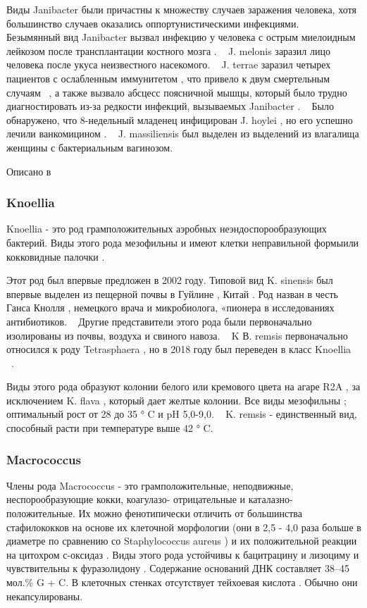 \documentclass[11pt]{article}
\begin{document}
	Виды Janibacter были причастны к множеству случаев заражения человека, хотя большинство случаев оказались оппортунистическими инфекциями.  ~\cite{Janibacter_8} Безымянный вид Janibacter вызвал инфекцию у человека с острым миелоидным лейкозом после трансплантации костного мозга .  ~\cite{Janibacter_9} J. melonis заразил лицо человека после укуса неизвестного насекомого.  ~\cite{Janibacter_10} J. terrae заразил четырех пациентов с ослабленным иммунитетом , что привело к двум смертельным случаям  ~\cite{Janibacter_11}, а также вызвало абсцесс поясничной мышцы, который было трудно диагностировать из-за редкости инфекций, вызываемых Janibacter . ~\cite{Janibacter_12} Было обнаружено, что 8-недельный младенец инфицирован J. hoylei , но его успешно лечили ванкомицином .  ~\cite{Janibacter_8} J. massiliensis был выделен из выделений из влагалища женщины с бактериальным вагинозом.  ~\cite{Janibacter_1}
	
	Описано в  ~\cite{Janibacter_1,Janibacter_2,Janibacter_3,Janibacter_4,Janibacter_5,Janibacter_6,Janibacter_7,Janibacter_8,Janibacter_9,Janibacter_10,Janibacter_11,Janibacter_12}
	
	\subsubsection{Knoellia}
	 Knoellia - это род грамположительных аэробных неэндоспорообразующих бактерий. Виды этого рода мезофильны и имеют клетки неправильной формыили кокковидные палочки . ~\cite{Knoellia_1,Knoellia_2}
	 
	 Этот род был впервые предложен в 2002 году. Типовой вид K. sinensis был впервые выделен из пещерной почвы в Гуйлине , Китай . Род назван в честь Ганса Кнолля , немецкого врача и микробиолога, «пионера в исследованиях антибиотиков. ~\cite{Knoellia_1} Другие представители этого рода были первоначально изолированы из почвы, воздуха и свиного навоза. ~\cite{Knoellia_3, Knoellia_4} K В. remsis первоначально относился к роду Tetrasphaera , но в 2018 году был переведен в класс Knoellia ~\cite{Knoellia_5, Knoellia_6}.
	 
	 Виды этого рода образуют колонии белого или кремового цвета на агаре R2A , за исключением K. flava , который дает желтые колонии. Все виды мезофильны ; оптимальный рост от 28 до 35 ° C и pH 5,0-9,0. ~\cite{Knoellia_2, Knoellia_4} K. remsis - единственный вид, способный расти при температуре выше 42 ° C. ~\cite{Knoellia_5}
	 
	\subsubsection{Macrococcus}
	Члены рода Macrococcus - это грамположительные, неподвижные, неспорообразующие кокки, коагулазо- отрицательные и каталазно- положительные. Их можно фенотипически отличить от большинства стафилококков на основе их клеточной морфологии (они в 2,5 - 4,0 раза больше в диаметре по сравнению со Staphylococcus aureus ) и их положительной реакции на цитохром с-оксидаз . Виды этого рода устойчивы к бацитрацину и лизоциму и чувствительны к фуразолидону . Содержание оснований ДНК составляет 38–45 мол.\% G + C. В клеточных стенках отсутствует тейхоевая кислота . Обычно они некапсулированы.
	
\end{document}
